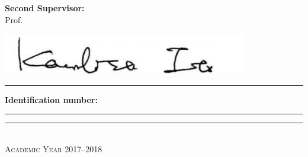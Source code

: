 \begin{titlepage}
\vspace{.05\textheight}

\begin{minipage}[3cm]{.4\textwidth}
\textbf{Second Supervisor:} \\ \smallskip
Prof. \mySupervisor

\smallskip
{\hspace{0.1\textwidth}\includegraphics[width=0.8\textwidth]{Images/firma_ito}}
\rule[.4cm]{\textwidth}{1pt}
\end{minipage}
\hfill
\begin{minipage}[3cm]{.4\textwidth}
\textbf{Identification number:} \\ 

\smallskip
\rule[0.4cm]{\textwidth}{0pt}
\end{minipage}
\begin{center}
\vfill
\rule{\textwidth}{1pt}\\
{\scshape Academic Year 2017--2018}









\end{center}
\end{titlepage}